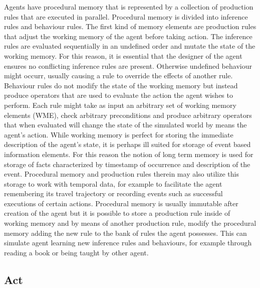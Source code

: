 Agents have procedural memory that is represented by a collection of production rules that are executed in parallel.
Procedural memory is divided into inference rules and behaviour rules.
The first kind of memory elements are production rules that adjust the working memory of the agent before taking action.
The inference rules are evaluated sequentially in an undefined order and mutate the state of the working memory.
For this reason, it is essential that the designer of the agent ensures no conflicting inference rules are present.
Otherwise undefined behaviour might occurr, usually causing a rule to override the effects of another rule.
Behaviour rules do not modify the state of the working memory but instead produce operators that are used to evaluate the action the agent wishes to perform.
Each rule might take as input an arbitrary set of working memory elements (WME), check arbitrary preconditions and produce arbitrary operators that when evaluated will change the state of the simulated world by means the agent's action.
While working memory is perfect for storing the immediate description of the agent's state, it is perhaps ill suited for storage of event based information elements.
For this reason the notion of long term memory is used for storage of facts characterized by timestamp of occurrence and description of the event.
Procedural memory and production rules therein may also utilize this storage to work with temporal data, for example to facilitate the agent remembering its travel trajectory or recording events such as successful executions of certain actions.
Procedural memory is usually immutable after creation of the agent but it is possible to store a production rule inside of working memory and by means of another production rule, modify the procedural memory adding the new rule to the bank of rules the agent possesses.
This can simulate agent learning new inference rules and behaviours, for example through reading a book or being taught by other agent.

\subsection{Act}

